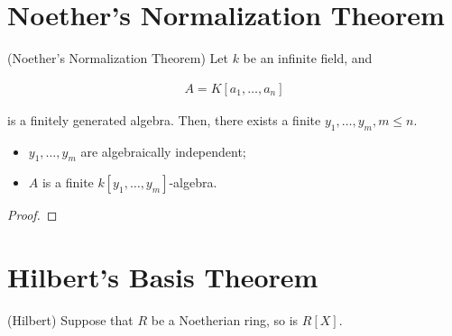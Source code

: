 \documentclass[Total.tex]{subfiles}
\begin{document}
		\section{Noether's Normalization Theorem}
		
			\begin{theorem}
				(Noether's Normalization Theorem)  Let $k$ be an infinite field, and 
				
				\begin{gather*}
					A=K[a_1,\dots,a_n]
				\end{gather*}
				
				is a finitely generated algebra. Then, there exists a finite $y_1,\dots,y_m,m\leq n$. 
				
				\begin{itemize}
					\item $y_1,\dots,y_m$ are algebraically independent;
					\item $A$ is a finite $k[y_1,\dots,y_m]$-algebra.
				\end{itemize}
			\end{theorem}
			
			\begin{proof}
			\end{proof}
			
		\section{Hilbert's Basis Theorem}
		
		\begin{theorem}
			(Hilbert) Suppose that $R$ be a Noetherian ring, so is $R[X]$.
		\end{theorem}
		
\end{document}
